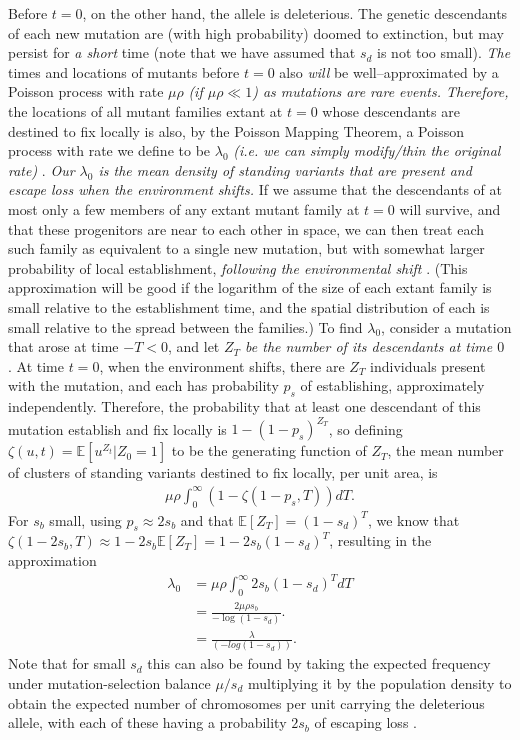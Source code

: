 \documentclass{article}
\newcommand{\gc}[1]{{\it\color{blue} #1} }
\newcommand{\mfp}[1]{{\it\color{red} #1} }
\newcommand{\E}{\mathbb{E}}
\begin{document}
Before $t=0$, on the other hand, the allele is deleterious.
The genetic descendants of each new mutation are (with high probability) doomed to extinction,
but may persist for \mfp{a short} time (note that we have assumed that $s_d$ is not too small).
\gc{The} times and locations of mutants before $t=0$ also \gc{will} be 
well--approximated by a 
Poisson process with rate $\mu \rho$ \gc{(if $\mu \rho \ll 1$) as
mutations are rare events. Therefore,} 
the locations of all mutant families extant at $t=0$ whose descendants are destined to fix locally is also,
by the Poisson Mapping Theorem, a Poisson process with rate we define
to be $\lambda_0$ \gc{(i.e. we can simply modify/thin the original rate)}.
\mfp{Our $\lambda_0$ is the mean density
of standing variants that are present and escape loss when the
environment shifts.}
If we assume that the descendants of at most only a few members of any extant mutant family at $t=0$ will survive,
and that these progenitors are near to each other in space, 
we can then treat each such family as equivalent to a single new mutation,
but with somewhat larger probability of local establishment,
\gc{following the environmental shift}.
(This approximation will be good 
if the logarithm of the size of each extant family is small relative to the establishment time,
and the spatial distribution of each is small relative to the spread between the families.)
To find $\lambda_0$, consider a mutation that arose at time $-T<0$, and let \gc{$Z_T$ be the number of its descendants at time $0$}.
At time $t=0$, when the environment shifts, there are $Z_T$ individuals present with the mutation,
and each has probability $p_s$ of establishing, approximately independently.
Therefore, the probability that at least one descendant of this mutation establish and fix locally is $1-(1-p_s)^{Z_T}$,
so defining $\zeta(u,t) = \E[u^{Z_t} | Z_0=1 ]$ to be the generating function of $Z_T$,
the mean number of clusters of standing variants destined to fix locally, per unit area, is
\begin{align*}
    \mu \rho \int_0^\infty \left( 1- \zeta(1-p_s,T) \right) dT .
\end{align*}
For $s_b$ small, using $p_s \approx 2s_b$ and that $\E[Z_T]=(1-s_d)^T$,
we know that $\zeta(1-2s_b,T) \approx 1-2s_b \E[Z_T] = 1-2s_b (1-s_d)^T$,
resulting in the approximation
\begin{align}
    \lambda_0 &= \mu \rho \int_0^\infty 2s_b (1-s_d)^{T} dT \\
        &= \frac{ 2 \mu \rho s_b }{ -\log(1-s_d) } .\\
        & =  \frac{\lambda }{ (-log(1-s_d)) }.
\end{align}
Note that for small $s_d$ this can also be found by taking the expected frequency under mutation-selection
balance $\mu/s_d $ \citep{Haldane:27,Haldane:37} multiplying it by the
population density to obtain the expected number of chromosomes per unit
carrying the deleterious allele, with each of these having a
probability $2s_b$ of escaping loss \citep[an analogous approach to
that taken by ][]{Orr:01}
. 
\end{document}
